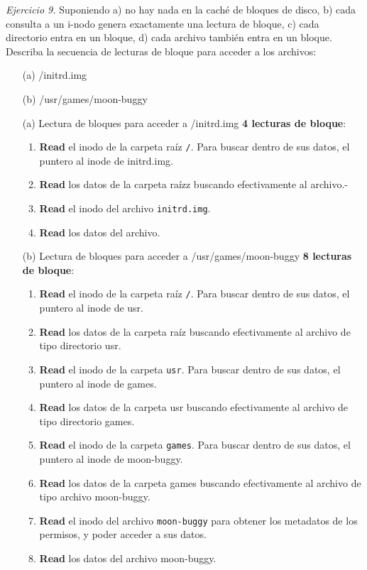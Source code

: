 \documentclass[12pt]{article}
\begin{document}
\noindent \textit{Ejercicio 9.} Suponiendo a) no hay nada en la caché de bloques de disco, b) cada consulta a un i-nodo genera exactamente una lectura de bloque, c) cada directorio entra en un bloque, d) cada archivo también entra en un bloque. Describa la secuencia de lecturas de bloque para acceder a los archivos:

\begin{itemize}
    \item[(a)] /initrd.img
    \item[(b)] /usr/games/moon-buggy
\end{itemize}

\begin{rta}
    \begin{itemize}
        \item[(a)] Lectura de bloques para acceder a /initrd.img \textbf{4 lecturas de bloque}:
        \begin{enumerate}
            \item \textbf{Read} el inodo de la carpeta raíz \texttt{/}. Para buscar dentro de sus datos, el puntero al inode de initrd.img.
            \item \textbf{Read} los datos de la carpeta raízz buscando efectivamente al archivo.-
            \item \textbf{Read} el inodo del archivo \texttt{initrd.img}.   
            \item \textbf{Read} los datos del archivo.
        \end{enumerate} 
        \item[(b)] Lectura de bloques para acceder a /usr/games/moon-buggy \textbf{8 lecturas de bloque}:
        \begin{enumerate}
            \item \textbf{Read} el inodo de la carpeta raíz \texttt{/}. Para buscar dentro de sus datos, el puntero al inode de usr.
            \item \textbf{Read} los datos de la carpeta raíz buscando efectivamente al archivo de tipo directorio usr.
            \item \textbf{Read} el inodo de la carpeta \texttt{usr}. Para buscar dentro de sus datos, el puntero al inode de games.
            \item \textbf{Read} los datos de la carpeta usr buscando efectivamente al archivo de tipo directorio games.
            \item \textbf{Read} el inodo de la carpeta \texttt{games}. Para buscar dentro de sus datos, el puntero al inode de moon-buggy.
            \item \textbf{Read} los datos de la carpeta games buscando efectivamente al archivo de tipo archivo moon-buggy.
            \item \textbf{Read} el inodo del archivo \texttt{moon-buggy} para obtener los metadatos de los permisos, y poder acceder a sus datos.
            \item \textbf{Read} los datos del archivo moon-buggy.
        \end{enumerate}
    \end{itemize}
\end{rta}
\end{document}
